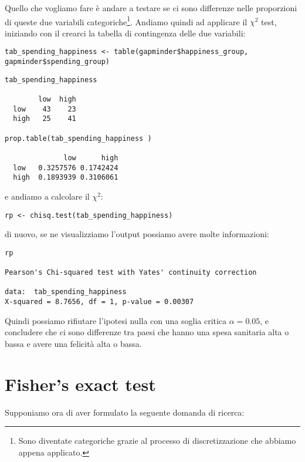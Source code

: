 \vspace{0.2cm}

\noindent Quello che vogliamo fare \`e andare a testare se ci sono differenze nelle proporzioni di queste due variabili categoriche\footnote{Sono diventate categoriche grazie al processo di discretizzazione che abbiamo appena applicato.}. Andiamo quindi ad applicare il $\chi^2$ test, iniziando con il crearci la tabella di contingenza delle due variabili:

\begin{lstlisting}[style=Rstylescript]
tab_spending_happiness <- table(gapminder$happiness_group, gapminder$spending_group)
\end{lstlisting}

\begin{lstlisting}[style=Rstyle]
tab_spending_happiness 
       
        low  high
  low    43    23
  high   25    41

prop.table(tab_spending_happiness )
       
              low      high
  low   0.3257576 0.1742424
  high  0.1893939 0.3106061
\end{lstlisting}
%
e andiamo a calcolare il $\chi^2$:

\begin{lstlisting}[style=Rstylescript]
rp <- chisq.test(tab_spending_happiness)
\end{lstlisting}
%
di nuovo, se ne visualizziamo l'output possiamo avere molte informazioni:

\begin{lstlisting}[style=Rstyle]
rp

Pearson's Chi-squared test with Yates' continuity correction

data:  tab_spending_happiness
X-squared = 8.7656, df = 1, p-value = 0.00307	 
\end{lstlisting}
%
Quindi possiamo rifiutare l'ipotesi nulla con una soglia critica $\alpha = 0.05$, e concludere che ci sono differenze tra paesi che hanno una spesa sanitaria alta o bassa e avere una felicit\`a alta o bassa.


\section{Fisher's exact test}


\noindent Supponiamo ora di aver formulato la seguente domanda di ricerca: 

\vspace{0.2cm}

